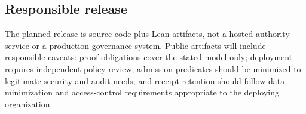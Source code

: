 \subsection{Responsible release}
\label{sec:ethical-considerations:release}

The planned release is source code plus Lean artifacts, not a hosted
authority service or a production governance system. Public artifacts
will include responsible caveats: proof obligations cover the stated
model only; deployment requires independent policy review; admission
predicates should be minimized to legitimate security and audit needs;
and receipt retention should follow data-minimization and access-control
requirements appropriate to the deploying organization.
